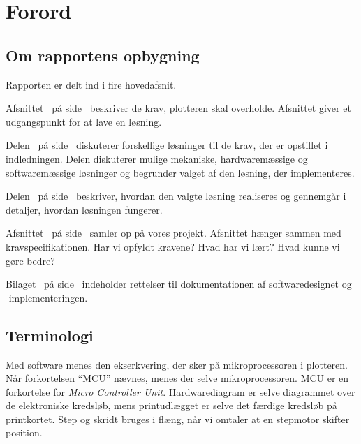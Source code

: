 \chapter{Forord}


\section{Om rapportens opbygning}

Rapporten er delt ind i fire hovedafsnit.

Afsnittet~ på side~\pageref{ch:indledning}
beskriver de krav, plotteren skal overholde. Afsnittet giver et
udgangspunkt for at lave en løsning.

Delen~ på side~\pageref{prt:design} diskuterer
forskellige løsninger til de krav, der er opstillet i
indledningen. Delen diskuterer mulige mekaniske, hardwaremæssige og
softwaremæssige løsninger og begrunder valget af den løsning, der
implementeres.

Delen~ på
side~\pageref{prt:implementering} beskriver, hvordan den valgte
løsning realiseres og gennemgår i detaljer, hvordan løsningen
fungerer.

Afsnittet~ på side~\pageref{ch:afslutning}
samler op på vores projekt.  Afsnittet hænger sammen med
kravspecifikationen. Har vi opfyldt kravene? Hvad har vi lært?  Hvad
kunne vi gøre bedre?  

Bilaget~ på
side~\pageref{ch:bilag-rettelser-software} indeholder rettelser til
dokumentationen af softwaredesignet og -implementeringen.


\section{Terminologi}


Med software menes den ekserkvering, der sker på mikroprocessoren i
plotteren. Når forkortelsen \enquote{MCU} nævnes, menes der selve
mikroprocessoren. MCU er en forkortelse for \textit{Micro Controller
  Unit}. Hardwarediagram er selve diagrammet over de elektroniske
kredsløb, mens printudlægget er selve det færdige kredsløb på
printkortet. Step og skridt bruges i flæng, når vi omtaler at en
stepmotor skifter position.  

